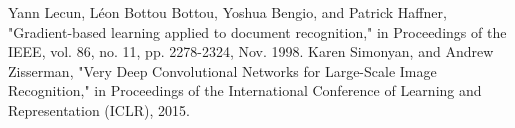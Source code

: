 \documentclass[logo,reportComp]{thesis}
\begin{document}
\begin{thebibliography}{99}
 Yann Lecun, Léon Bottou Bottou, Yoshua Bengio, and Patrick Haffner, "Gradient-based learning applied to document recognition," in Proceedings of the IEEE, vol. 86, no. 11, pp. 2278-2324, Nov. 1998.
 Karen Simonyan, and Andrew Zisserman, "Very Deep Convolutional Networks for Large-Scale Image Recognition," in Proceedings of the International Conference of Learning and Representation (ICLR), 2015.
\end{thebibliography}
\end{document}
